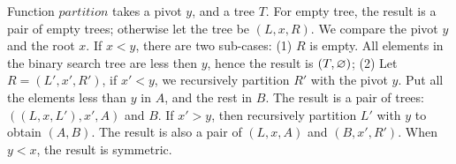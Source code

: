 \documentclass[b5paper]{article}
\begin{document}
\be
{}
\ee

Function $partition$ takes a pivot $y$, and a tree $T$. For empty tree, the result is a pair of empty trees; otherwise let the tree be $(L, x, R)$. We compare the pivot $y$ and the root $x$. If $x < y$, there are two sub-cases: (1) $R$ is empty. All elements in the binary search tree are less then $y$, hence the result is $(T, \varnothing)$; (2) Let $R = (L', x', R')$, if $x' < y$, we recursively partition $R'$ with the pivot $y$. Put all the elements less than $y$ in $A$, and the rest in $B$. The result is a pair of trees: $((L, x, L'), x', A)$ and $B$. If $x' > y$, then recursively partition $L'$ with $y$ to obtain $(A, B)$. The result is also a pair of $(L, x, A)$ and $(B, x', R')$. When $y < x$, the result is symmetric.
\end{document}
